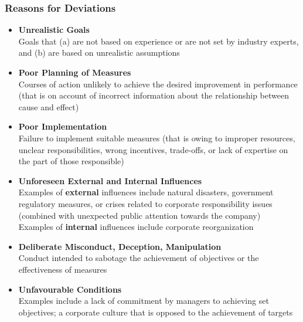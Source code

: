 \documentclass[11pt]{article}
\theoremstyle{definition}
\begin{document}
\subsubsection{Reasons for Deviations}
\begin{itemize}
	\item \textbf{Unrealistic Goals}\\ Goals that (a) are not based on experience or are not set by industry experts, and (b) are based on unrealistic assumptions
	\item \textbf{Poor Planning of Measures}\\ Courses of action unlikely to achieve the desired improvement in performance (that is on account of incorrect information about the relationship between cause and effect)
	\item \textbf{Poor Implementation}\\ Failure to implement suitable measures (that is owing to improper resources, unclear responsibilities, wrong incentives, trade-offs, or lack of expertise on the part of those responsible)
	\item \textbf{Unforeseen External and Internal Influences}\\ Examples of \textbf{external} influences include natural disasters, government regulatory measures, or crises related to corporate responsibility issues (combined with unexpected public attention towards the company)\\ Examples of \textbf{internal} influences include corporate reorganization
	\item \textbf{Deliberate Misconduct, Deception, Manipulation}\\ Conduct intended to sabotage the achievement of objectives or the effectiveness of measures
	\item \textbf{Unfavourable Conditions}\\ Examples include a lack of commitment by managers to achieving set objectives; a corporate culture that is opposed to the achievement of targets
\end{itemize}
\end{document}
